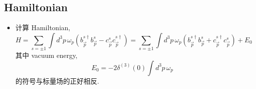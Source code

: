 \subsection{Hamiltonian}
\begin{itemize}
	\item 计算 Hamiltonian,
	\begin{equation}
		H = \sum_{s = \pm 1} \int d^3 p \, \omega_p (b^{s \dag}_{\vec{p}} b^s_{\vec{p}} - c^s_{\vec{p}} c^{s \dag}_{\vec{p}}) = \sum_{s = \pm 1} \int d^3 p \, \omega_p (b^{s \dag}_{\vec{p}} b^s_{\vec{p}} + c^{s \dag}_{\vec{p}} c^s_{\vec{p}}) + E_0
	\end{equation}
	其中 vacuum energy,
	\begin{equation} \label{8.4.2}
		E_0 = - 2 \delta^{(3)}(0) \int d^3 p \, \omega_p
	\end{equation}
	的符号与标量场的正好相反.
	

\end{itemize}
